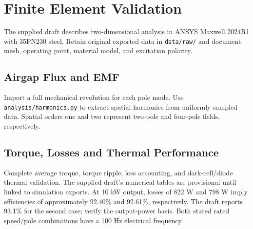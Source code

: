\section{Finite Element Validation}
The supplied draft describes two-dimensional analysis in ANSYS Maxwell 2024R1 with 35PN230 steel. Retain original exported data in \texttt{data/raw/} and document mesh, operating point, material model, and excitation polarity.
\subsection{Airgap Flux and EMF}
Import a full mechanical revolution for each pole mode. Use \texttt{analysis/harmonics.py} to extract spatial harmonics from uniformly sampled data. Spatial orders one and two represent two-pole and four-pole fields, respectively.
\subsection{Torque, Losses and Thermal Performance}
Complete average torque, torque ripple, loss accounting, and dark-cell/diode thermal validation. The supplied draft's numerical tables are provisional until linked to simulation exports.
At 10 kW output, losses of 822 W and 798 W imply efficiencies of approximately 92.40\% and 92.61\%, respectively. The draft reports 93.1\% for the second case; verify the output-power basis. Both stated rated speed/pole combinations have a 100 Hz electrical frequency.
